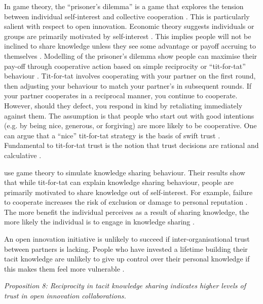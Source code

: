 In game theory, the \enquote{prisoner’s dilemma} is a game that explores the tension between individual self-interest and collective cooperation \citep{richards2001reciprocity}. This is particularly salient with respect to open innovation. Economic theory suggests individuals or groups are primarily motivated by self-interest \citep{axelrod1984evolution}. This implies people will not be inclined to share knowledge unless they see some advantage or payoff accruing to themselves \citep{yang2006knowledge}. Modelling of the prisoner's dilemma show people can maximise their pay-off through cooperative action based on simple reciprocity or \enquote{tit-for-tat} behaviour \citep{axelrod1981evolution,richards2001reciprocity}. Tit-for-tat involves cooperating with your partner on the first round, then adjusting your behaviour to match your partner’s in subsequent rounds. If your partner cooperates in a reciprocal manner, you continue to cooperate. However, should they defect, you respond in kind by retaliating immediately against them. The assumption is that people who start out with good intentions (e.g. by being nice, generous, or forgiving) are more likely to be cooperative. One can argue that a \enquote{nice} tit-for-tat strategy is the basis of swift trust \citep{fulmer2013trust,mollering2013process}. Fundamental to tit-for-tat trust is the notion that trust decisions are rational and calculative \citep{fulmer2013trust}. \medskip

\citet{yang2006knowledge} use game theory to simulate knowledge sharing behaviour. Their results show that while tit-for-tat can explain knowledge sharing behaviour, people are primarily motivated to share knowledge out of self-interest. For example, failure to cooperate increases the risk of exclusion or damage to personal reputation \citep{blais1987epistemic}. The more benefit the individual perceives as a result of sharing knowledge, the more likely the individual is to engage in knowledge sharing \citep{bock2001breaking,witherspoon2013antecedents}. \medskip

An open innovation initiative is unlikely to succeed if inter-organisational trust between partners is lacking. People who have invested a lifetime building their tacit knowledge are unlikely to give up control over their personal knowledge if this makes them feel more vulnerable \citep{leonard1998role,lin2007share}. 

\emph{Proposition 8: Reciprocity in tacit knowledge sharing indicates higher levels of trust in open innovation collaborations.}


